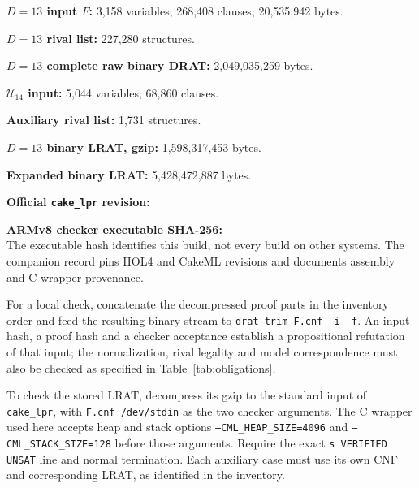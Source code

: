 \documentclass[11pt,a4paper]{article}
\theoremstyle{definition}
\newcommand{\U}{\mathcal U_{14}}
\begin{document}
\begingroup\small
\noindent\textbf{$D=13$ input $F$:} 3,158 variables; 268,408 clauses;
20,535,942 bytes.\\

\medskip\noindent\textbf{$D=13$ rival list:} 227,280 structures.\\

\medskip\noindent\textbf{$D=13$ complete raw binary DRAT:}
2,049,035,259 bytes.\\

\medskip\noindent\textbf{$\U$ input:} 5,044 variables; 68,860 clauses.\\

\medskip\noindent\textbf{Auxiliary rival list:} 1,731 structures.\\

\medskip\noindent\textbf{$D=13$ binary LRAT, gzip:}
1,598,317,453 bytes.\\

\medskip\noindent\textbf{Expanded binary LRAT:} 5,428,472,887 bytes.\\

\medskip\noindent\textbf{Official \texttt{cake\_lpr} revision:}\\

\medskip\noindent\textbf{ARMv8 checker executable SHA-256:}\\
The executable hash identifies this build, not every build on other
systems. The companion record pins HOL4 and CakeML revisions and
documents assembly and C-wrapper provenance.
\endgroup

\medskip
For a local check, concatenate the decompressed proof parts in the
inventory order and feed the resulting binary stream to
\texttt{drat-trim F.cnf -i -f}. An input hash, a proof hash and a checker
acceptance establish a propositional refutation of that input; the
normalization, rival legality and model correspondence must also be
checked as specified in Table~\ref{tab:obligations}.

To check the stored LRAT, decompress its gzip to the standard input of
\texttt{cake\_lpr}, with \texttt{F.cnf /dev/stdin} as the two checker
arguments. The C wrapper used here accepts heap and stack options
\texttt{--CML\_HEAP\_SIZE=4096} and \texttt{--CML\_STACK\_SIZE=128} before
those arguments. Require the exact \texttt{s VERIFIED UNSAT} line and
normal termination. Each auxiliary case must use its own CNF and
corresponding LRAT, as identified in the inventory.
\end{document}
